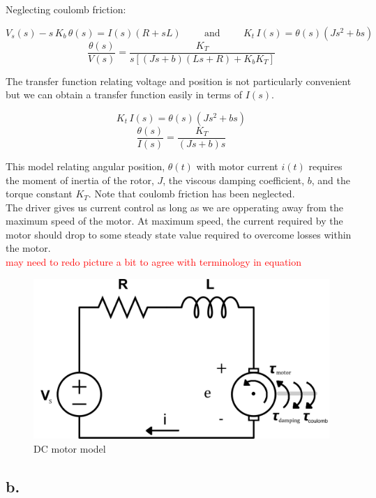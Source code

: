 \documentclass{article}
\newcommand{\xxx}[1]{\textcolor{red}{#1}}
\theoremstyle{plain}
\theoremstyle{definition}
\theoremstyle{remark}
\begin{document}
Neglecting coulomb friction:

$$ V_{s}(s) - s \, K_{b} \, \theta (s) = I(s) (R+sL) \hspace{1cm} \text{and} \hspace{1cm} K_{t} \, I(s) = \theta(s)(Js^2+bs) $$
$$ \frac{\theta(s)}{V(s)} = \frac{K_T}{s\left[ (Js + b)(Ls + R)+K_bK_T \right]} $$

The transfer function relating voltage and position is not particularly convenient but we can obtain a transfer function easily in terms of $I(s)$.

$$ K_{t} \, I(s) = \theta(s)(Js^2+bs) $$
$$ \frac{\theta(s)}{I(s)} = \frac{K_T}{(Js + b)s} $$

This model relating angular position, $\theta(t)$ with motor current $i(t)$ requires the moment of inertia of the rotor, $J$, the viscous damping coefficient, $b$, and the torque constant $K_T$.  Note that coulomb friction has been neglected. \\

The driver gives us current control as long as we are opperating away from the maximum speed of the motor.  At maximum speed, the current required by the motor should drop to some steady state value required to overcome losses within the motor.\\

\xxx{may need to redo picture a bit to agree with terminology in equation}
\begin{figure}[htb]
\begin{center}
\includegraphics[width = 13cm]{dcmotor.png}
\caption{DC motor model}
\label{q2_a1}
\end{center}
\end{figure}

\subsection*{b.}
\end{document}
